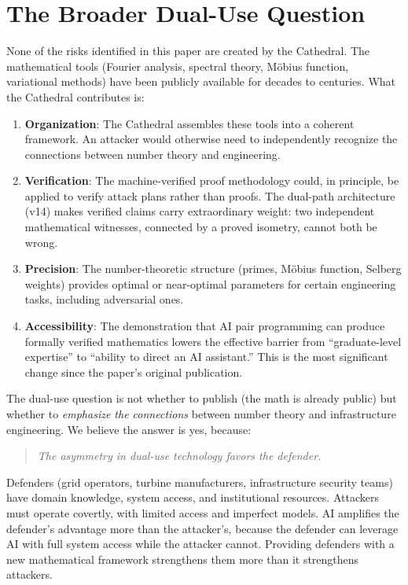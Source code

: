 \documentclass[11pt,a4paper]{article}
\begin{document}
\section{The Broader Dual-Use Question}

None of the risks identified in this paper are created by the
Cathedral. The mathematical tools (Fourier analysis, spectral
theory, M\"obius function, variational methods) have been publicly
available for decades to centuries. What the Cathedral contributes
is:

\begin{enumerate}
  \item \textbf{Organization}: The Cathedral assembles these tools
    into a coherent framework. An attacker would otherwise need to
    independently recognize the connections between number theory
    and engineering.
  \item \textbf{Verification}: The machine-verified proof
    methodology could, in principle, be applied to verify attack
    plans rather than proofs. The dual-path architecture (v14)
    makes verified claims carry extraordinary weight: two
    independent mathematical witnesses, connected by a proved
    isometry, cannot both be wrong.
  \item \textbf{Precision}: The number-theoretic structure (primes,
    M\"obius function, Selberg weights) provides optimal or
    near-optimal parameters for certain engineering tasks,
    including adversarial ones.
  \item \textbf{Accessibility}: The demonstration that AI pair
    programming can produce formally verified mathematics lowers
    the effective barrier from ``graduate-level expertise'' to
    ``ability to direct an AI assistant.'' This is the most
    significant change since the paper's original publication.
\end{enumerate}

The dual-use question is not whether to publish (the math is
already public) but whether to \emph{emphasize the connections}
between number theory and infrastructure engineering. We believe
the answer is yes, because:

\begin{quote}
\emph{The asymmetry in dual-use technology favors the defender.}
\end{quote}

Defenders (grid operators, turbine manufacturers, infrastructure
security teams) have domain knowledge, system access, and
institutional resources. Attackers must operate covertly, with
limited access and imperfect models. AI amplifies the defender's
advantage more than the attacker's, because the defender can
leverage AI with full system access while the attacker cannot.
Providing defenders with a
new mathematical framework strengthens them more than it
strengthens attackers.
\end{document}
